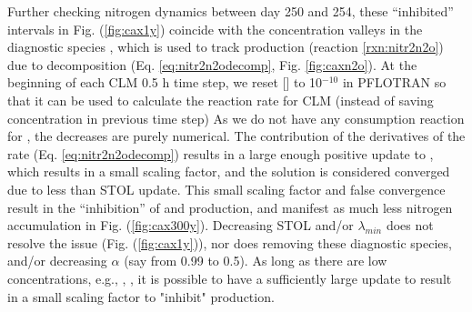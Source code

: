 \documentclass[gmd, manuscript]{copernicus}
\begin{document}
Further checking nitrogen dynamics between day 250 and 254, these ``inhibited''
intervals in Fig. (\ref{fig:cax1y}) coincide with the concentration valleys
in the diagnostic species , which is used to track 
production (reaction \ref{rxn:nitr2n2o}) due to decomposition (Eq.
\ref{eq:nitr2n2odecomp}, Fig. \ref{fig:caxn2o}). At the
beginning of each CLM 0.5 h time step, we reset [] to
10$^{-10}$ in PFLOTRAN so that it can be used to calculate the reaction rate
for CLM (instead of saving concentration in previous time step)
As we do not have any
consumption reaction for , the decreases are purely numerical. The
contribution of the derivatives of the rate (Eq.
\ref{eq:nitr2n2odecomp}) results in a large enough positive update
to , which results in a small scaling factor, and the solution is
considered converged due to less than STOL update. This small scaling factor
and false convergence result in the ``inhibition'' of  and
 production, and manifest as much less nitrogen accumulation in
Fig. (\ref{fig:cax300y}). Decreasing STOL and/or $\lambda_{min}$ does not
resolve the issue (Fig. (\ref{fig:cax1y})), nor does removing these diagnostic
species, and/or decreasing $\alpha$ (say from 0.99 to 0.5). As long as there are 
low concentrations, e.g., , , it is possible to have
a sufficiently large update to result in a small scaling factor to "inhibit"
production.   


\end{document}
